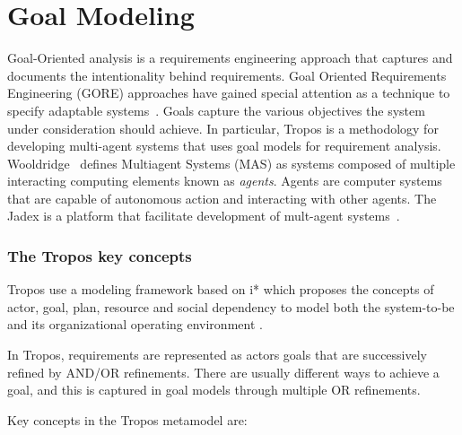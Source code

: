 \section{Goal Modeling}

Goal-Oriented analysis is a requirements engineering approach that captures and documents the intentionality behind requirements. Goal Oriented Requirements Engineering (GORE) approaches have gained special attention as a technique to specify adaptable systems~\cite{morandini_goal-oriented_2009}. Goals capture the various objectives the system under consideration should achieve. In particular, Tropos\cite{bresciani_tropos:_2004} is a methodology for developing multi-agent systems that uses goal models for requirement analysis.
Wooldridge~\cite{woolridge_introduction_2001} defines Multiagent Systems (MAS) as systems composed of multiple interacting computing elements known as \emph{agents}.
Agents are computer systems that are capable of autonomous action and interacting with other agents. The Jadex is a platform that facilitate development of mult-agent systems~\cite{braubach_developing_2012}.

\subsubsection{The Tropos key concepts}

Tropos use a modeling framework based on i* \cite{yu_modelling_1996} which proposes the concepts of actor, goal, plan, resource and social dependency to model both the system-to-be and its organizational operating environment \cite{bresciani_tropos:_2004} \cite{morandini_tropos_2014}.

In Tropos, requirements are represented as actors goals that are successively refined by AND/OR refinements. There are usually different ways to achieve a goal, and this is captured in goal models through multiple OR refinements.

Key concepts in the Tropos metamodel are:

